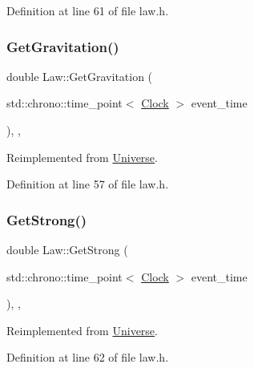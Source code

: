 Definition at line 61 of file law.\+h.

\mbox{\label{class_law_a84bdc0c2ca97a9c19422018ff761b992}} 
\subsubsection{\texorpdfstring{Get\+Gravitation()}{GetGravitation()}}
{\footnotesize\ttfamily double Law\+::\+Get\+Gravitation (\begin{DoxyParamCaption}\item[{std\+::chrono\+::time\+\_\+point$<$ \mbox{\hyperlink{universe_8h_a0ef8d951d1ca5ab3cfaf7ab4c7a6fd80}{Clock}} $>$}]{event\+\_\+time }\end{DoxyParamCaption})\hspace{0.3cm}{\ttfamily [inline]}, {\ttfamily [final]}, {\ttfamily [virtual]}}



Reimplemented from \mbox{\hyperlink{class_universe_ab0404e774ee0ed66b597ff5b8e989446}{Universe}}.



Definition at line 57 of file law.\+h.

\mbox{\label{class_law_afd94bf09dbaf5d5df36b8f093db02dd9}} 
\subsubsection{\texorpdfstring{Get\+Strong()}{GetStrong()}}
{\footnotesize\ttfamily double Law\+::\+Get\+Strong (\begin{DoxyParamCaption}\item[{std\+::chrono\+::time\+\_\+point$<$ \mbox{\hyperlink{universe_8h_a0ef8d951d1ca5ab3cfaf7ab4c7a6fd80}{Clock}} $>$}]{event\+\_\+time }\end{DoxyParamCaption})\hspace{0.3cm}{\ttfamily [inline]}, {\ttfamily [final]}, {\ttfamily [virtual]}}



Reimplemented from \mbox{\hyperlink{class_universe_acb453ce71da418c5b5617fecede9571b}{Universe}}.



Definition at line 62 of file law.\+h.

